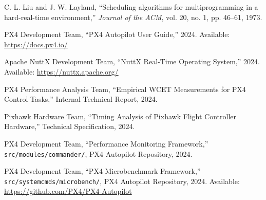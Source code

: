 \documentclass[11pt,a4paper]{article}
\theoremstyle{definition}
\theoremstyle{remark}
\begin{document}
\newpage


\begin{thebibliography}{99}

C. L. Liu and J. W. Layland, ``Scheduling algorithms for multiprogramming in a hard-real-time environment,'' \emph{Journal of the ACM}, vol. 20, no. 1, pp. 46--61, 1973.

PX4 Development Team, ``PX4 Autopilot User Guide,'' 2024. Available: \url{https://docs.px4.io/}

Apache NuttX Development Team, ``NuttX Real-Time Operating System,'' 2024. Available: \url{https://nuttx.apache.org/}

PX4 Performance Analysis Team, ``Empirical WCET Measurements for PX4 Control Tasks,'' Internal Technical Report, 2024.

Pixhawk Hardware Team, ``Timing Analysis of Pixhawk Flight Controller Hardware,'' Technical Specification, 2024.

PX4 Development Team, ``Performance Monitoring Framework,'' \texttt{src/modules/commander/}, PX4 Autopilot Repository, 2024.

PX4 Development Team, ``PX4 Microbenchmark Framework,'' \texttt{src/systemcmds/microbench/}, PX4 Autopilot Repository, 2024. Available: \url{https://github.com/PX4/PX4-Autopilot}

\end{thebibliography}
\end{document}
